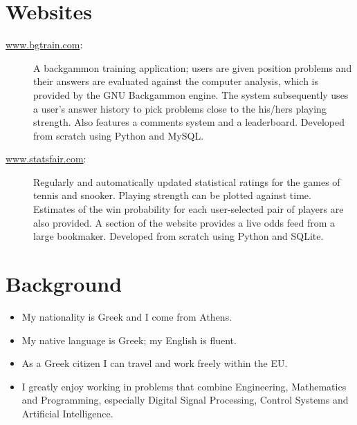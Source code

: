 \documentclass [a4paper,11pt]{article}
\begin{document}
	\section* {Websites}
		\begin {description}
			\item [\url{www.bgtrain.com}:] A backgammon training application;
			users are given position problems and their answers are evaluated
			against the computer analysis, which is provided by the GNU
			Backgammon engine.  The system subsequently uses a user's answer
			history to pick problems close to the his/hers playing strength.
			Also features a comments system and a leaderboard. Developed from
			scratch using Python and MySQL.
			\item [\url{www.statsfair.com}:] Regularly and automatically
			updated statistical ratings for the games of tennis and snooker.
			Playing strength can be plotted against time. Estimates of the win
			probability for each user-selected pair of players are also
			provided. A section of the website provides a live odds feed from a
			large bookmaker. Developed from scratch using Python and SQLite.
		\end {description}




	\section* {Background}
		\begin {itemize}
			\item My nationality is Greek and I come from Athens.
			\item My native language is Greek; my English is fluent.
			\item As a Greek citizen I can travel and work freely within the EU.
			\item I greatly enjoy working in problems that combine Engineering,
			Mathematics and Programming, especially Digital Signal Processing,
			Control Systems and Artificial Intelligence.
		\end {itemize}
\end{document}
